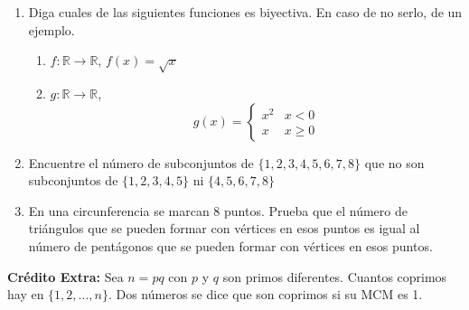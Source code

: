 \begin{enumerate}
    \item Diga cuales de las siguientes funciones es biyectiva. En caso de no serlo, de un ejemplo.
    \begin{enumerate}
        \item $f:\mathbb{R}\to\mathbb{R}$, $f(x)=\sqrt{x}$
        \item $g:\mathbb{R}\to\mathbb{R}$, \[g(x)=\begin{cases}
            x^2 & x<0\\
            x & x\geq 0
        \end{cases}\]
    \end{enumerate}
    \item Encuentre el número de subconjuntos de $\{1,2,3,4,5,6,7,8\}$ que no son subconjuntos de $\{1,2,3,4,5\}$ ni $\{4,5,6,7,8\}$
    \item En una circunferencia se marcan 8 puntos. Prueba que el número de triángulos que se pueden formar con vértices en esos puntos es igual al número de pentágonos que se pueden formar con vértices en esos puntos.
\end{enumerate}

\textbf{Crédito Extra:} Sea $n=pq$ con $p$ y $q$ son primos diferentes. Cuantos coprimos hay en $\{1,2,\dots,n\}$. Dos números se dice que son coprimos si su MCM es 1.